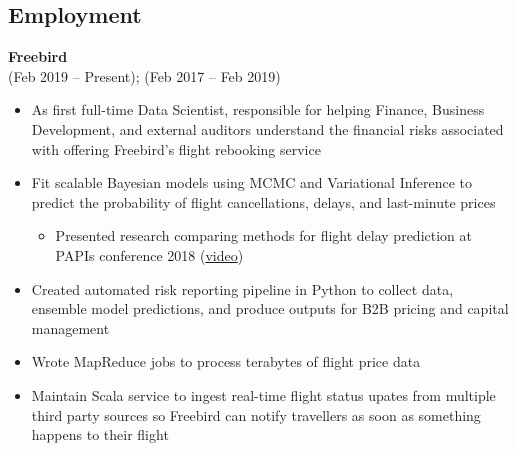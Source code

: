 \documentclass{res}
\begin{document}
 
\setlength{\parskip}{10pt}
\renewcommand{\labelitemi}{\scriptsize$\bullet$} 

\address{\hspace{2pt} (917) 536-7410}
\address{\href{http://maxlivingston.org}{maxlivingston.org}}

\begin{resume} 
  \section{Employment}
  {\bf Freebird} \\ 
   (Feb 2019 -- Present);  (Feb 2017 -- Feb 2019)
  \begin{itemize} \itemsep 2.0pt \parskip 2.0pt %
    \item As first full-time Data Scientist, responsible for helping Finance, Business Development, and external auditors understand the financial risks associated with offering Freebird's flight rebooking service
  \item Fit scalable Bayesian models using MCMC and Variational Inference to predict the probability of flight cancellations, delays, and last-minute prices
    \setlength{\parskip}{-1.75pt} 
    \begin{itemize}
      \setlength{\itemsep}{1.5pt}
    \item Presented research comparing methods for flight delay prediction at PAPIs conference 2018 (\href{https://www.infoq.com/presentations/flight-bayesian-prediction}{video})
    \end{itemize}
    \setlength{\parskip}{2.0pt} 
  \item Created automated risk reporting pipeline in Python to collect data, ensemble model predictions, and produce outputs for B2B pricing and capital management
  \item Wrote MapReduce jobs to process terabytes of flight price data
  \item Maintain Scala service to ingest real-time flight status upates from multiple third party sources so Freebird can notify travellers as soon as something happens to their flight
  \end{itemize}


\end{resume}
\end{document}
